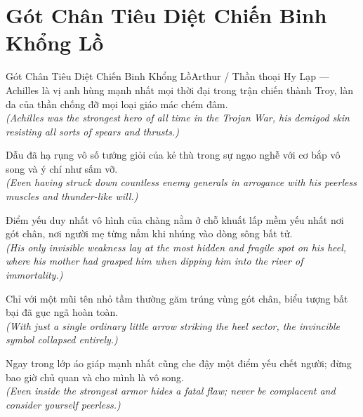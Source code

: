 \section{Gót Chân Tiêu Diệt Chiến Binh Khổng Lồ}
\begin{truyen}{Gót Chân Tiêu Diệt Chiến Binh Khổng Lồ}{Arthur / Thần thoại Hy Lạp --- Achilles}
 là vị anh hùng mạnh nhất mọi thời đại trong trận chiến thành Troy, làn da của thần chống đỡ mọi loại giáo mác chém đâm.\\[4pt]
\textit{(Achilles was the strongest hero of all time in the Trojan War, his demigod skin resisting all sorts of spears and thrusts.)}

Dẫu đã hạ rụng vô số tướng giỏi của kẻ thù trong sự ngạo nghễ với cơ bắp vô song và ý chí như sấm vỡ.\\[4pt]
\textit{(Even having struck down countless enemy generals in arrogance with his peerless muscles and thunder-like will.)}

Điểm yếu duy nhất vô hình của chàng nằm ở chỗ khuất lấp mềm yếu nhất nơi gót chân, nơi người mẹ từng nắm khi nhúng vào dòng sông bất tử.\\[4pt]
\textit{(His only invisible weakness lay at the most hidden and fragile spot on his heel, where his mother had grasped him when dipping him into the river of immortality.)}

Chỉ với một mũi tên nhỏ tầm thường găm trúng vùng gót chân, biểu tượng bất bại đã gục ngã hoàn toàn.\\[4pt]
\textit{(With just a single ordinary little arrow striking the heel sector, the invincible symbol collapsed entirely.)}

\end{truyen}
\begin{baihoc}
  Ngay trong lớp áo giáp mạnh nhất cũng che đậy một điểm yếu chết người; đừng bao giờ chủ quan và cho mình là vô song.\\[4pt]
  \textit{(Even inside the strongest armor hides a fatal flaw; never be complacent and consider yourself peerless.)}
\end{baihoc}


